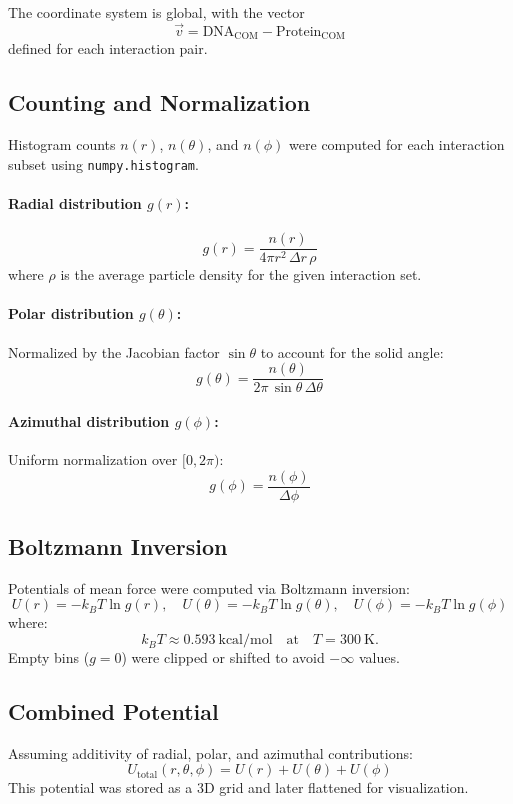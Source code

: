 \documentclass[12pt,a4paper]{report}
\begin{document}
The coordinate system is global, with the vector
\[
\vec{v} = \mathrm{DNA}_{\mathrm{COM}} - \mathrm{Protein}_{\mathrm{COM}}
\]
defined for each interaction pair.

\subsection*{Counting and Normalization}

Histogram counts $n(r)$, $n(\theta)$, and $n(\phi)$ were computed for each interaction subset using \texttt{numpy.histogram}.

\paragraph{Radial distribution $g(r)$:}
\[
g(r) = \frac{n(r)}{4\pi r^{2} \, \Delta r \, \rho}
\]
where $\rho$ is the average particle density for the given interaction set.

\paragraph{Polar distribution $g(\theta)$:}
Normalized by the Jacobian factor $\sin\theta$ to account for the solid angle:
\[
g(\theta) = \frac{n(\theta)}{2\pi \, \sin\theta \, \Delta\theta}
\]

\paragraph{Azimuthal distribution $g(\phi)$:}
Uniform normalization over $[0, 2\pi)$:
\[
g(\phi) = \frac{n(\phi)}{\Delta\phi}
\]

\subsection*{Boltzmann Inversion}

Potentials of mean force were computed via Boltzmann inversion:
\[
U(r) = -k_{B}T \ln g(r), \quad
U(\theta) = -k_{B}T \ln g(\theta), \quad
U(\phi) = -k_{B}T \ln g(\phi)
\]
where:
\[
k_{B}T \approx 0.593 \ \mathrm{kcal/mol} \quad \text{at} \quad T = 300 \ \mathrm{K}.
\]
Empty bins ($g=0$) were clipped or shifted to avoid $-\infty$ values.

\subsection*{Combined Potential}

Assuming additivity of radial, polar, and azimuthal contributions:
\[
U_{\mathrm{total}}(r, \theta, \phi) = U(r) + U(\theta) + U(\phi)
\]
This potential was stored as a 3D grid and later flattened for visualization.
\end{document}

